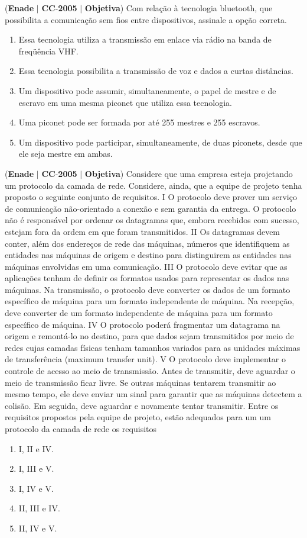 \documentclass{exam}
\begin{document}
\begin{questions}
\question (\textbf{Enade} $|$ \textbf{CC}-\textbf{2005} $|$ \textbf{Objetiva})
Com relação à tecnologia bluetooth, que possibilita a
comunicação sem fios entre dispositivos, assinale a opção
correta.
	\begin{enumerate}[label=\alph*)]
		\item  Essa tecnologia utiliza a transmissão em enlace via rádio na
banda de freqüência VHF.
		\item  Essa tecnologia possibilita a transmissão de voz e dados a
curtas distâncias.
		\item  Um dispositivo pode assumir, simultaneamente, o papel de
mestre e de escravo em uma mesma piconet que utiliza essa
tecnologia.
		\item  Uma piconet pode ser formada por até 255 mestres e
255 escravos.
		\item  Um dispositivo pode participar, simultaneamente, de duas
piconets, desde que ele seja mestre em ambas.
	\end{enumerate}

\question (\textbf{Enade} $|$ \textbf{CC}-\textbf{2005} $|$ \textbf{Objetiva})
Considere que uma empresa esteja projetando um protocolo da camada de rede. Considere, ainda, que a equipe de projeto tenha
proposto o seguinte conjunto de requisitos.
I O protocolo deve prover um serviço de comunicação não-orientado a conexão e sem garantia da entrega. O protocolo não é
responsável por ordenar os datagramas que, embora recebidos com sucesso, estejam fora da ordem em que foram transmitidos.
II Os datagramas devem conter, além dos endereços de rede das máquinas, números que identifiquem as entidades nas máquinas de
origem e destino para distinguirem as entidades nas máquinas envolvidas em uma comunicação.
III O protocolo deve evitar que as aplicações tenham de definir os formatos usados para representar os dados nas máquinas. Na
transmissão, o protocolo deve converter os dados de um formato específico de máquina para um formato independente de máquina.
Na recepção, deve converter de um formato independente de máquina para um formato específico de máquina.
IV O protocolo poderá fragmentar um datagrama na origem e remontá-lo no destino, para que dados sejam transmitidos por meio de
redes cujas camadas físicas tenham tamanhos variados para as unidades máximas de transferência (maximum transfer unit).
V O protocolo deve implementar o controle de acesso ao meio de transmissão. Antes de transmitir, deve aguardar o meio de
transmissão ficar livre. Se outras máquinas tentarem transmitir ao mesmo tempo, ele deve enviar um sinal para garantir que as
máquinas detectem a colisão. Em seguida, deve aguardar e novamente tentar transmitir.
Entre os requisitos propostos pela equipe de projeto, estão adequados para um um protocolo da camada de rede os requisitos
	\begin{enumerate}[label=\alph*)]
		\item  I, II e IV. 
		\item  I, III e V. 
		\item  I, IV e V. 
		\item  II, III e IV. 
		\item  II, IV e V.
	\end{enumerate}


\end{questions}
\end{document}
